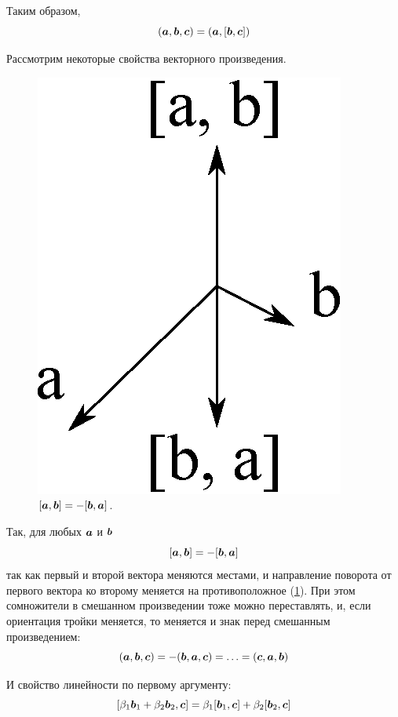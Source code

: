 \documentclass[a4paper,12pt]{article}
\begin{document}
  Таким образом,
  \begin{equation}\label{eq:triple-as-scalar-and-vector}
    (\boldsymbol a, \boldsymbol b, \boldsymbol c) = (\boldsymbol a, [\boldsymbol b, \boldsymbol c])
  \end{equation}
  
  Рассмотрим некоторые свойства векторного произведения.
  
  \begin{figure}[h]
    \centering
    
    \includegraphics[width=0.2\columnwidth]{ab-ba}
    
    \caption{$[\boldsymbol a, \boldsymbol b] = -[\boldsymbol b, \boldsymbol a]$.}
    \label{fig:ab-ba}
  \end{figure}
    
  Так, для любых $\boldsymbol a$ и $\boldsymbol b$
  \[
    [\boldsymbol a, \boldsymbol b] = -[\boldsymbol b, \boldsymbol a]
  \]
  так как первый и второй вектора меняются местами, и направление поворота от первого вектора ко второму меняется на противоположное (\ref{fig:ab-ba}).
  При этом сомножители в смешанном произведении тоже можно переставлять, и, если ориентация тройки меняется, то меняется и знак перед смешанным произведением:
  \begin{equation}\label{eq:triple-change-order}
    (\boldsymbol a, \boldsymbol b, \boldsymbol c) = -(\boldsymbol b, \boldsymbol a, \boldsymbol c) = \ldots = (\boldsymbol c, \boldsymbol a, \boldsymbol b)
  \end{equation}
  
  
  И свойство линейности по первому аргументу:
  \[
    [\beta_1 \boldsymbol b_1 + \beta_2 \boldsymbol b_2, \boldsymbol c] = \beta_1 [\boldsymbol b_1, \boldsymbol c] + \beta_2 [\boldsymbol b_2, \boldsymbol c]
  \]
  
\end{document}
